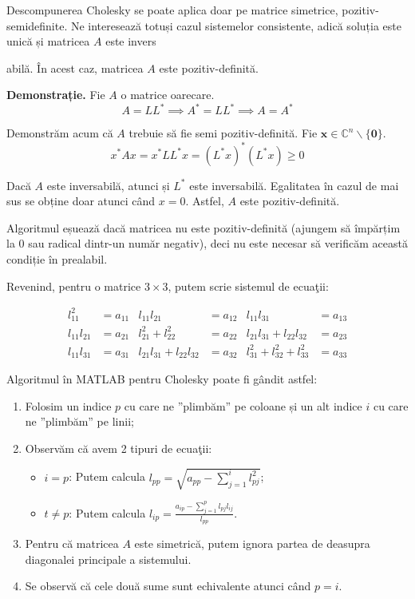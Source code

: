 \documentclass{exam}
\begin{document}
Descompunerea Cholesky se poate aplica doar pe matrice simetrice,
pozitiv-semidefinite. Ne interesează totuși cazul sistemelor consistente, adică
soluția este unică și matricea $A$ este invers


abilă. În acest caz, matricea $A$
este pozitiv-definită.

\textbf{Demonstrație.} Fie $A$ o matrice oarecare.
\begin{equation*}
	A = LL^* \implies A^* = LL^* \implies A = A^*
\end{equation*}

Demonstrăm acum că $A$ trebuie să fie semi pozitiv-definită. Fie $\mathbf{x} \in \mathbb{C}^n \backslash \{\mathbf{0}\}$.
\begin{equation*}
	x^* A x = x^* LL^* x = (L^* x)^* (L^* x) \geq 0
\end{equation*}

Dacă $A$ este inversabilă, atunci și $L^*$ este inversabilă. Egalitatea în cazul
de mai sus se obține doar atunci când $x = 0$. Astfel, $A$ este pozitiv-definită.

Algoritmul eșuează dacă matricea nu este pozitiv-definită (ajungem să
împărțim la 0 sau radical dintr-un număr negativ), deci nu este necesar să
verificăm această condiție în prealabil.

\newpage
\par Revenind, pentru o matrice $3 \times 3$, putem scrie sistemul de ecuaţii:

\begin{align*}
	l_{11}^2     & = a_{11} & l_{11}l_{21}                & = a_{12} & l_{11}l_{31}                   & = a_{13} \\
	l_{11}l_{21} & = a_{21} & l_{21}^2 + l_{22}^2         & = a_{22} & l_{21}l_{31} + l_{22}l_{32}    & = a_{23} \\
	l_{11}l_{31} & = a_{31} & l_{21}l_{31} + l_{22}l_{32} & = a_{32} & l_{31}^2 + l_{32}^2 + l_{33}^2 & = a_{33}
\end{align*}

\par Algoritmul în MATLAB pentru Cholesky poate fi gândit astfel:

\begin{enumerate}
	\item Folosim un indice $p$ cu care ne ”plimbăm” pe coloane și un alt indice $i$ cu care ne ”plimbăm” pe linii;
	\item Observăm că avem 2 tipuri de ecuaţii:
	      \begin{itemize}
		      \item $i = p$: Putem calcula $l_{pp} = \sqrt{a_{pp} - \sum_{j = 1}^{i}{l_{pj}^2}}$;
		      \item $t \neq p$: Putem calcula $l_{ip} = \frac{a_{ip} - \sum_{j = 1}^{p}{l_{pj} l_{ij}}}{l_{pp}}$.
	      \end{itemize}
	\item Pentru că matricea $A$ este simetrică, putem ignora partea de deasupra
	      diagonalei principale a sistemului.
	\item Se observă că cele două sume sunt echivalente atunci când $p = i$.
\end{enumerate}
\end{document}
